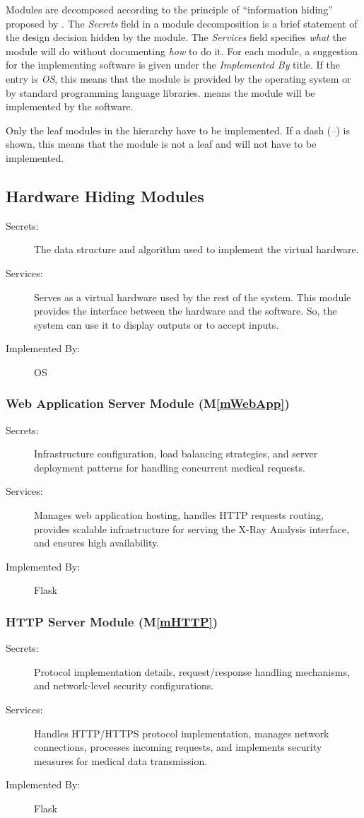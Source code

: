 \documentclass[12pt, titlepage]{article}
\newcommand{\mref}[1]{M\ref{#1}}
\begin{document}
Modules are decomposed according to the principle of ``information hiding''
proposed by \citet{ParnasEtAl1984}. The \emph{Secrets} field in a module
decomposition is a brief statement of the design decision hidden by the
module. The \emph{Services} field specifies \emph{what} the module will do
without documenting \emph{how} to do it. For each module, a suggestion for the
implementing software is given under the \emph{Implemented By} title. If the
entry is \emph{OS}, this means that the module is provided by the operating
system or by standard programming language libraries.  \emph{\progname{}} means the
module will be implemented by the \progname{} software.

Only the leaf modules in the hierarchy have to be implemented. If a dash
(\emph{--}) is shown, this means that the module is not a leaf and will not have
to be implemented.

\subsection{Hardware Hiding Modules}

\begin{description}
\item[Secrets:]The data structure and algorithm used to implement the virtual
  hardware.
\item[Services:]Serves as a virtual hardware used by the rest of the
  system. This module provides the interface between the hardware and the
  software. So, the system can use it to display outputs or to accept inputs.
\item[Implemented By:] OS
\end{description}
\subsubsection{Web Application Server Module (\mref{mWebApp})}
\begin{description}
\item[Secrets:] Infrastructure configuration, load balancing strategies, and server deployment patterns for handling concurrent medical requests.
\item[Services:] Manages web application hosting, handles HTTP requests routing, provides scalable infrastructure for serving the X-Ray Analysis interface, and ensures high availability.
\item[Implemented By:] Flask
\end{description}
\subsubsection{HTTP Server Module (\mref{mHTTP})}
\begin{description}
\item[Secrets:] Protocol implementation details, request/response handling mechanisms, and network-level security configurations.
\item[Services:] Handles HTTP/HTTPS protocol implementation, manages network connections, processes incoming requests, and implements security measures for medical data transmission.
\item[Implemented By:] Flask
\end{description}
\end{document}

